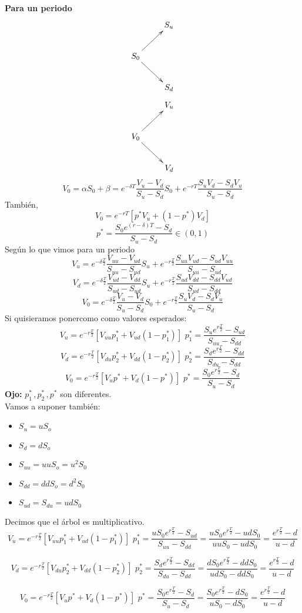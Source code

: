 \documentclass[12pts]{extarticle}
\begin{document}
\textbf{Para un periodo} 
$$\xymatrix{&S_u \\ S_0 \ar[ru] \ar[dr] & \\ &S_d}$$
 $$\xymatrix{&V_u \\ V_0 \ar[ru] \ar[dr] & \\ &V_d}$$ 
$$V_0 =\alpha S_0 +\beta = e^{-\delta T}\frac{V_{u}-V_{d}}{S_{u}-S_{d}}S_0+e^{-rT}\frac{S_{u}V_{d}-S_{d}V_{u}}{S_{u}-S_{d}}$$ 
También, 
$$V_0=e^{-rT}[p^{*}V_u+(1-p^{*})V_d]$$
$$p^{*}=\frac{S_0 e^{(r-\delta)T}-S_d}{S_u-S_d} \in (0,1)$$ 
Según lo que vimos para un periodo
$$ V_u=e^{-\delta \frac{T}{2}}\frac{V_{uu}-V_{ud}}{S_{uu}-S_{ud}}S_u+e^{-r\frac{T}{2}}\frac{S_{uu}V_{ud}-S_{ud}V_{uu}}{S_{uu}-S_{ud}}$$
$$V_d=e^{-\delta \frac{T}{2}}\frac{V_{ud}-V_{dd}}{S_{ud}-S_{ud}}S_u+e^{-r\frac{T}{2}}\frac{S_{ud}V_{dd}-S_{dd}V_{ud}}{S_{ud}-S_{dd}}$$
$$V_0=e^{-\delta \frac{T}{2}}\frac{V_{u}-V_{d}}{S_{u}-S_{d}}S_0+e^{-r\frac{T}{2}}\frac{S_{u}V_{d}-S_{d}V_{u}}{S_{u}-S_{d}}$$
Si quisieramos ponercomo como valores esperados:
$$V_u=e^{-r \frac{T}{2}}[V_{uu}p_1^{*}+V_{ud}(1-p_1^{*})] \, \, p_1^{*}=\frac{S_u e^{r \frac{T}{2}}-S_{ud}}{S_{uu}-S_{dd}}$$
$$V_d=e^{-r \frac{T}{2}}[V_{du}p_2^{*}+V_{dd}(1-p_2^{*})] \, \, p_2^{*}=\frac{S_d e^{r \frac{T}{2}}-S_{dd}}{S_{du}-S_{dd}}$$
$$V_0=e^{-r \frac{T}{2}}[V_{u}p^{*}+V_{d}(1-p^{*})] \, \, p^{*}=\frac{S_0 e^{r \frac{T}{2}}-S_{d}}{S_{u}-S_{d}}$$
\textbf{Ojo:} $p_1^{*} \, , p_2^{*} \, , p^{*}$ son diferentes. 
\\
Vamos a suponer también: 
\begin{itemize} 
\item $S_u=uS_o$
\item $S_{d}=dS_o$
\item $S_{uu}=uuS_o=u^2S_0$
\item $S_{dd}=ddS_o=d^2S_0$
\item $S_{ud}=S_{du}=udS_0$
\end{itemize} 
Decimos que el árbol es multiplicativo. 
$$V_u= e^{-r \frac{T}{2}}[V_{uu}p_1^{*}+V_{ud}(1-p_1^{*})] \, \, p_1^{*}=\frac{u S_0 e^{r \frac{T}{2}}-S_{ud}}{S_{uu}-S_{dd}} = \frac{u S_0 e^{r \frac{T}{2}}-udS_0}{uuS_0-udS_0}=\frac{e^{r \frac{T}{2}} -d}{u-d} $$  

$$V_d=e^{-r \frac{T}{2}}[V_{du}p_2^{*}+V_{dd}(1-p_2^{*})] \, \, p_2^{*}=\frac{S_d e^{r \frac{T}{2}}-S_{dd}}{S_{du}-S_{dd}}= \frac{dS_0 e^{r \frac{T}{2}}-ddS_0}{udS_0-ddS_0}=\frac{e^{r\frac{T}{2}} -d}{u-d}$$

$$V_0=e^{-r \frac{T}{2}}[V_{u}p^{*}+V_{d}(1-p^{*})] \, \, p^{*}=\frac{S_0 e^{r \frac{T}{2}}-S_{d}}{S_{u}-S_{d}}=\frac{S_0 e^{r \frac{T}{2}}-dS_0}{uS_0-dS_0}=\frac{e^{r\frac{T}{2}} -d}{u-d}$$
\end{document}
